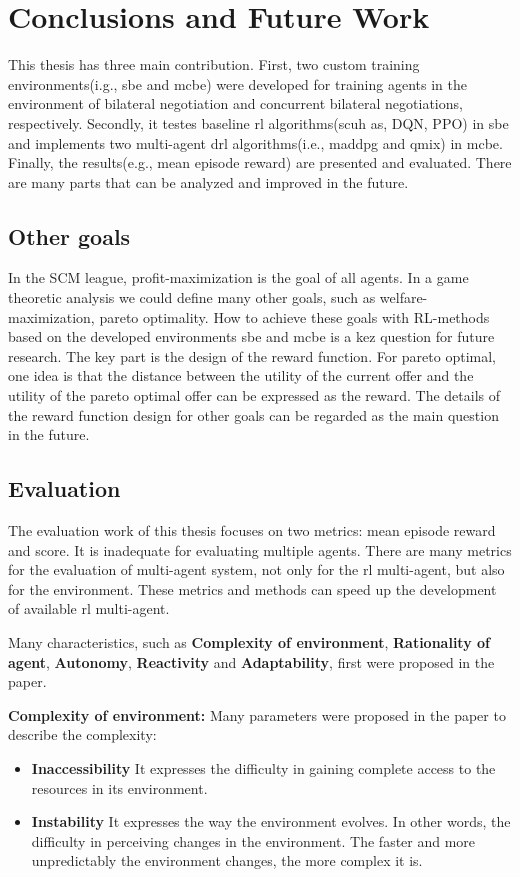 \chapter{Conclusions and Future Work}
This thesis has three main contribution. First, two custom training environments(i.g., \gls{sbe} and \gls{mcbe}) were developed for training agents in the environment of bilateral negotiation and concurrent bilateral negotiations, respectively. Secondly, it testes baseline \gls{rl} algorithms(scuh as, DQN, PPO) in \gls{sbe} and implements two multi-agent drl algorithms(i.e., maddpg and qmix) in \gls{mcbe}. Finally, the results(e.g., mean episode reward) are presented and evaluated. There are many parts that can be analyzed and improved in the future.

\section{Other goals}
In the SCM league, profit-maximization is the goal of all agents. In a game theoretic analysis we could define many other goals, such as welfare-maximization, pareto optimality. How to achieve these goals with RL-methods based on the developed environments \gls{sbe} and \gls{mcbe} is a kez question for future research. The key part is the design of the reward function. For pareto optimal, one idea is that the distance between the utility of the current offer and the utility of the pareto optimal offer can be expressed as the reward. The details of the reward function design for other goals can be regarded as the main question in the future.

\section{Evaluation}
The evaluation work of this thesis focuses on two metrics: mean episode reward and score. It is inadequate for evaluating multiple agents. There are many metrics for the evaluation of multi-agent system, not only for the \gls{rl} multi-agent, but also for the environment. These metrics and methods can speed up the development of available \gls{rl} multi-agent. 

Many characteristics, such as \textbf{Complexity of environment}, \textbf{Rationality of agent}, \textbf{Autonomy}, \textbf{Reactivity} and \textbf{Adaptability}, first were proposed in the paper\parencite{Bitonto2010}.

\textbf{Complexity of environment:} Many parameters were proposed in the paper to describe the complexity:
\begin{itemize}
\item \textbf{Inaccessibility} It expresses the difficulty in gaining complete access to the resources in its environment.
\item \textbf{Instability} It expresses the way the environment evolves. In other words, the difficulty in perceiving changes in the environment. The faster and more unpredictably the environment changes, the more complex it is.
\end{itemize}

